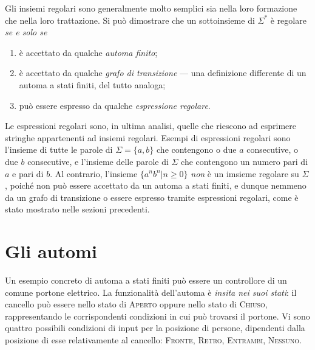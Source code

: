 \documentclass[10pt]{\classname}
\theoremstyle{definition}
\theoremstyle{definition}
\begin{document}
Gli insiemi regolari sono generalmente molto semplici sia nella loro formazione che nella loro trattazione. Si può dimostrare che un sottoinsieme di
$\Sigma^*$ è regolare \emph{se e solo se}

\begin{enumerate}
    \item è accettato da qualche \emph{automa finito};
    \item è accettato da qualche \emph{grafo di transizione} --- una
        definizione differente di un automa a stati finiti, del tutto analoga;
    \item può essere espresso da qualche \emph{espressione regolare}.
\end{enumerate}

Le espressioni regolari sono, in ultima analisi, quelle che riescono ad
esprimere stringhe appartenenti ad insiemi regolari. Esempi di espressioni
regolari sono l'insieme di tutte le parole di $\Sigma = \{a, b\}$ che
contengono o due $a$ consecutive, o due $b$ consecutive, e l'insieme delle
parole di $\Sigma$ che contengono un numero pari di $a$ e pari di $b$. Al
contrario, l'insieme $\{a^n b^n| n\geq 0\}$ \emph{non} è un imsieme regolare su
$\Sigma$, poiché non può essere accettato da un automa a stati finiti, e dunque nemmeno da un grafo di transizione o essere espresso tramite espressioni regolari, come è stato mostrato nelle sezioni precedenti.

\section{Gli automi}

Un esempio concreto di automa a stati finiti può essere un controllore di un comune portone elettrico.
La funzionalità dell'automa è \emph{insita nei suoi stati}: il cancello può essere
nello stato di \textsc{Aperto } oppure nello stato di \textsc{Chiuso}, rappresentando le
corrispondenti condizioni in cui può trovarsi il portone. Vi sono quattro possibili condizioni di
input per la posizione di persone, dipendenti dalla posizione di esse relativamente al cancello:
\textsc{Fronte}, \textsc{Retro}, \textsc{Entrambi}, \textsc{Nessuno}.
\end{document}
